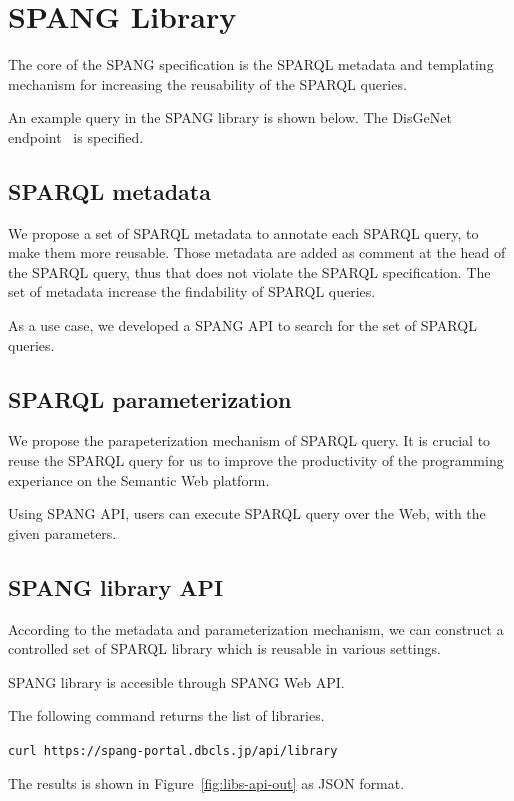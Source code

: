 \documentclass[runningheads]{llncs}
\begin{document}
\section{SPANG Library}

The core of the SPANG specification is the SPARQL metadata and templating mechanism for increasing the reusability of the SPARQL queries.

An example query in the SPANG library is shown below.
The DisGeNet endpoint~\cite{disgenet} is specified.


\subsection{SPARQL metadata}

We propose a set of SPARQL metadata to annotate each SPARQL query, to make them more reusable.
Those metadata are added as comment at the head of the SPARQL query, thus that does not violate the SPARQL specification. 
The set of metadata increase the findability of SPARQL queries.

As a use case, we developed a SPANG API to search for the set of SPARQL queries.

\subsection{SPARQL parameterization}

We propose the parapeterization mechanism of SPARQL query. It is crucial to reuse the SPARQL query for us to improve the productivity of the programming experiance on the Semantic Web platform.

Using SPANG API, users can execute SPARQL query over the Web, with the given parameters.


\subsection{SPANG library API}
According to the metadata and parameterization mechanism, we can construct a controlled set of SPARQL library which is reusable in various settings.

SPANG library is accesible through SPANG Web API.

The following command returns the list of libraries.

\texttt{curl https://spang-portal.dbcls.jp/api/library}

The results is shown in Figure~\ref{fig:libs-api-out} as JSON format.
\end{document}
